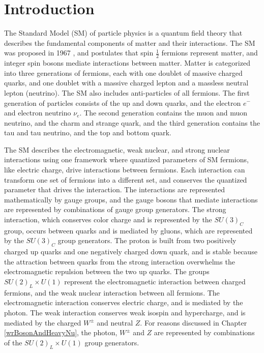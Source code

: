 \chapter{Introduction}
\label{intro_chapter}
The Standard Model (SM) of particle physics is a quantum field theory that describes the fundamental 
components of matter and their interactions.  The SM was proposed in 
1967 \cite{weinbergSM,salamSM}, and postulates that spin $\frac{1}{2}$ fermions represent matter, and 
integer spin bosons mediate interactions between matter.  Matter is categorized into three generations 
of fermions, each with one doublet of massive charged quarks, and one doublet with a massive charged 
lepton and a massless neutral lepton (neutrino).  The SM also includes anti-particles of all fermions.  
The first generation of particles consists of the up and down quarks, and the electron $e^{-}$ and electron neutrino $\nu_{e}$.  
The second generation contains the muon and muon neutrino, and the charm and strange quark, and the 
third generation contains the tau and tau neutrino, and the top and bottom quark.

The SM describes the electromagnetic, weak nuclear, and strong nuclear interactions using one framework 
where quantized parameters of SM fermions, like electric charge, drive interactions between fermions.  
Each interaction can transform one set of fermions into a different set, and conserves the quantized 
parameter that drives the interaction.  The interactions are represented mathematically by gauge groups, and the 
gauge bosons that mediate interactions are represented by combinations of gauge group 
generators.  The strong interaction, which conserves color charge and is represented by the $SU(3)_{C}$ 
group, occurs between quarks and is mediated by gluons, which are represented by the $SU(3)_{C}$ group 
generators.  The proton is built from two positively charged up quarks and one negatively charged down 
quark, and is stable because the attraction between quarks from the strong interaction overwhelms the 
electromagnetic repulsion between the two up quarks.  The groups $SU(2)_{L} \times U(1)$ represent the 
electromagnetic interaction between charged fermions, and the weak nuclear interaction between all fermions.  
The electromagnetic interaction conserves electric charge, and is mediated by the photon.  The weak 
interaction conserves weak isospin and hypercharge, and is mediated by the charged $W^{\pm}$ and neutral 
$Z$.  For reasons discussed in Chapter \ref{wrBosonAndHeavyNu}, the photon, $W^{\pm}$ and $Z$ are 
represented by combinations of the $SU(2)_{L} \times U(1)$ group generators.

